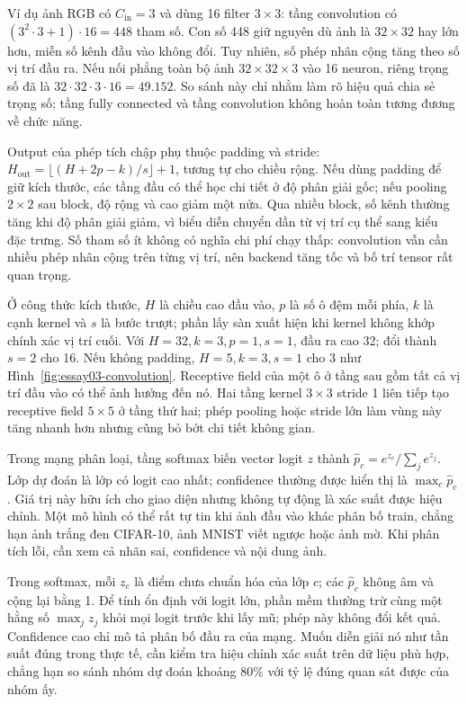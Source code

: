 \documentclass[12pt,a4paper]{report}
\begin{document}
Ví dụ ảnh RGB có $C_{\mathrm{in}}=3$ và dùng 16 filter $3\times3$: tầng convolution có $(3^2\cdot3+1)\cdot16=448$ tham số. Con số 448 giữ nguyên dù ảnh là $32\times32$ hay lớn hơn, miễn số kênh đầu vào không đổi. Tuy nhiên, số phép nhân cộng tăng theo số vị trí đầu ra. Nếu nối phẳng toàn bộ ảnh $32\times32\times3$ vào 16 neuron, riêng trọng số đã là $32\cdot32\cdot3\cdot16=49.152$. So sánh này chỉ nhằm làm rõ hiệu quả chia sẻ trọng số; tầng fully connected và tầng convolution không hoàn toàn tương đương về chức năng.

Output của phép tích chập phụ thuộc padding và stride: $H_{\mathrm{out}}=\lfloor(H+2p-k)/s\rfloor+1$, tương tự cho chiều rộng. Nếu dùng padding để giữ kích thước, các tầng đầu có thể học chi tiết ở độ phân giải gốc; nếu pooling $2\times2$ sau block, độ rộng và cao giảm một nửa. Qua nhiều block, số kênh thường tăng khi độ phân giải giảm, vì biểu diễn chuyển dần từ vị trí cụ thể sang kiểu đặc trưng. Số tham số ít không có nghĩa chi phí chạy thấp: convolution vẫn cần nhiều phép nhân cộng trên từng vị trí, nên backend tăng tốc và bố trí tensor rất quan trọng.

Ở công thức kích thước, $H$ là chiều cao đầu vào, $p$ là số ô đệm mỗi phía, $k$ là cạnh kernel và $s$ là bước trượt; phần lấy sàn xuất hiện khi kernel không khớp chính xác vị trí cuối. Với $H=32,k=3,p=1,s=1$, đầu ra cao 32; đổi thành $s=2$ cho 16. Nếu không padding, $H=5,k=3,s=1$ cho 3 như Hình~\ref{fig:essay03-convolution}. Receptive field của một ô ở tầng sau gồm tất cả vị trí đầu vào có thể ảnh hưởng đến nó. Hai tầng kernel $3\times3$ stride 1 liên tiếp tạo receptive field $5\times5$ ở tầng thứ hai; phép pooling hoặc stride lớn làm vùng này tăng nhanh hơn nhưng cũng bỏ bớt chi tiết không gian.

Trong mạng phân loại, tầng softmax biến vector logit $z$ thành $\hat p_c=e^{z_c}/\sum_j e^{z_j}$. Lớp dự đoán là lớp có logit cao nhất; confidence thường được hiển thị là $\max_c\hat p_c$. Giá trị này hữu ích cho giao diện nhưng không tự động là xác suất được hiệu chỉnh. Một mô hình có thể rất tự tin khi ảnh đầu vào khác phân bố train, chẳng hạn ảnh trắng đen CIFAR-10, ảnh MNIST viết ngược hoặc ảnh mờ. Khi phân tích lỗi, cần xem cả nhãn sai, confidence và nội dung ảnh.

Trong softmax, mỗi $z_c$ là điểm chưa chuẩn hóa của lớp $c$; các $\hat p_c$ không âm và cộng lại bằng 1. Để tính ổn định với logit lớn, phần mềm thường trừ cùng một hằng số $\max_j z_j$ khỏi mọi logit trước khi lấy mũ; phép này không đổi kết quả. Confidence cao chỉ mô tả phân bố đầu ra của mạng. Muốn diễn giải nó như tần suất đúng trong thực tế, cần kiểm tra hiệu chỉnh xác suất trên dữ liệu phù hợp, chẳng hạn so sánh nhóm dự đoán khoảng 80\% với tỷ lệ đúng quan sát được của nhóm ấy.
\end{document}
